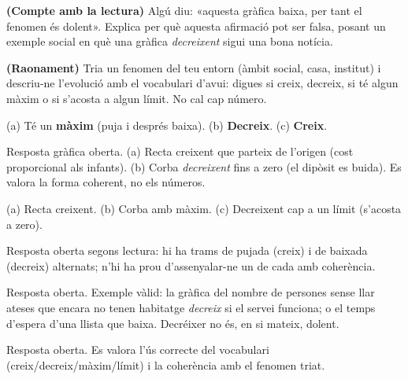 \begin{exercicis}
\begin{exlist}
        \begin{center}
\end{center}

  \item \textbf{(Compte amb la lectura)} Algú diu: «aquesta gràfica baixa, per tant
        el fenomen és dolent». Explica per què aquesta afirmació pot ser falsa, posant
        un exemple social en què una gràfica \emph{decreixent} sigui una bona notícia.
  \item \textbf{(Raonament)} Tria un fenomen del teu entorn (àmbit social, casa,
        institut) i descriu-ne l'evolució amb el vocabulari d'avui: digues si creix,
        decreix, si té algun màxim o si s'acosta a algun límit. No cal cap número.
\end{exlist}
\end{exercicis}

\begin{solucions}
\begin{sollist}
  \item (a) Té un \textbf{màxim} (puja i després baixa). \quad
        (b) \textbf{Decreix}. \quad (c) \textbf{Creix}.
  \item Resposta gràfica oberta. (a) Recta creixent que parteix de l'origen (cost
        proporcional als infants). (b) Corba \emph{decreixent} fins a zero (el dipòsit
        es buida). Es valora la forma coherent, no els números.
  \item (a) Recta creixent. \quad (b) Corba amb màxim. \quad
        (c) Decreixent cap a un límit (s'acosta a zero).
  \item Resposta oberta segons lectura: hi ha trams de pujada (creix) i de baixada
        (decreix) alternats; n'hi ha prou d'assenyalar-ne un de cada amb coherència.
  \item Resposta oberta. Exemple vàlid: la gràfica del nombre de persones sense llar
        ateses que encara no tenen habitatge \emph{decreix} si el servei funciona; o el
        temps d'espera d'una llista que baixa. Decréixer no és, en si mateix, dolent.
  \item Resposta oberta. Es valora l'ús correcte del vocabulari (creix/decreix/màxim/límit)
        i la coherència amb el fenomen triat.
\end{sollist}
\end{solucions}
